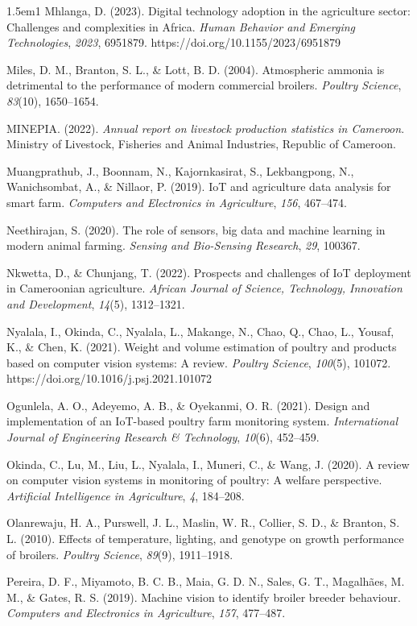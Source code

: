 \documentclass[12pt,a4paper]{report}
\begin{document}
\begin{hangparas}{1.5em}{1}
Mhlanga, D. (2023). Digital technology adoption in the agriculture sector: Challenges and complexities in Africa. \textit{Human Behavior and Emerging Technologies}, \textit{2023}, 6951879. https://doi.org/10.1155/2023/6951879

Miles, D. M., Branton, S. L., \& Lott, B. D. (2004). Atmospheric ammonia is detrimental to the performance of modern commercial broilers. \textit{Poultry Science}, \textit{83}(10), 1650--1654.

MINEPIA. (2022). \textit{Annual report on livestock production statistics in Cameroon}. Ministry of Livestock, Fisheries and Animal Industries, Republic of Cameroon.

Muangprathub, J., Boonnam, N., Kajornkasirat, S., Lekbangpong, N., Wanichsombat, A., \& Nillaor, P. (2019). IoT and agriculture data analysis for smart farm. \textit{Computers and Electronics in Agriculture}, \textit{156}, 467--474.

Neethirajan, S. (2020). The role of sensors, big data and machine learning in modern animal farming. \textit{Sensing and Bio-Sensing Research}, \textit{29}, 100367.

Nkwetta, D., \& Chunjang, T. (2022). Prospects and challenges of IoT deployment in Cameroonian agriculture. \textit{African Journal of Science, Technology, Innovation and Development}, \textit{14}(5), 1312--1321.

Nyalala, I., Okinda, C., Nyalala, L., Makange, N., Chao, Q., Chao, L., Yousaf, K., \& Chen, K. (2021). Weight and volume estimation of poultry and products based on computer vision systems: A review. \textit{Poultry Science}, \textit{100}(5), 101072. https://doi.org/10.1016/j.psj.2021.101072

Ogunlela, A. O., Adeyemo, A. B., \& Oyekanmi, O. R. (2021). Design and implementation of an IoT-based poultry farm monitoring system. \textit{International Journal of Engineering Research \& Technology}, \textit{10}(6), 452--459.

Okinda, C., Lu, M., Liu, L., Nyalala, I., Muneri, C., \& Wang, J. (2020). A review on computer vision systems in monitoring of poultry: A welfare perspective. \textit{Artificial Intelligence in Agriculture}, \textit{4}, 184--208.

Olanrewaju, H. A., Purswell, J. L., Maslin, W. R., Collier, S. D., \& Branton, S. L. (2010). Effects of temperature, lighting, and genotype on growth performance of broilers. \textit{Poultry Science}, \textit{89}(9), 1911--1918.

Pereira, D. F., Miyamoto, B. C. B., Maia, G. D. N., Sales, G. T., Magalh\~aes, M. M., \& Gates, R. S. (2019). Machine vision to identify broiler breeder behaviour. \textit{Computers and Electronics in Agriculture}, \textit{157}, 477--487.


\end{hangparas}
\end{document}
